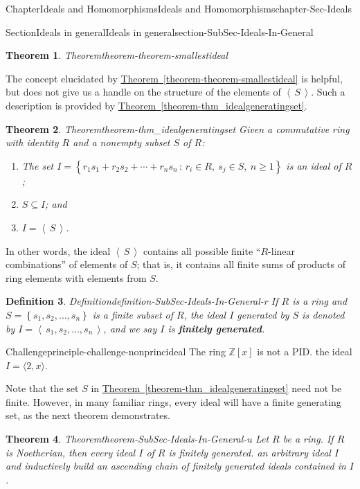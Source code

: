 \documentclass[oneside,10pt,]{book}
\newcommand{\xreffont}{\relax}
\newcommand{\terminology}[1]{\textbf{#1}}
\numberwithin{equation}{section}
\renewcommand{\ge}{\geqslant}
\newcommand{\ideal}[1]{\left\langle\, #1 \,\right\rangle}
\newcommand{\set}[1]{\left\{ {#1} \right\}}
\newcommand{\setof}[2]{{\left\{#1\,\colon\,#2\right\}}}
\def\Z{{\mathbb Z}}
\newtheorem{theorem}{Theorem}[section]
\newtheorem{definition}[theorem]{Definition}
\begin{document}
\begin{chapterptx}{Chapter}{Ideals and Homomorphisms}{}{Ideals and Homomorphisms}{}{}{chapter-Sec-Ideals}
\begin{sectionptx}{Section}{Ideals in general}{}{Ideals in general}{}{}{section-SubSec-Ideals-In-General}
\begin{theorem}{Theorem}{}{}{theorem-theorem-smallestideal}
\end{theorem}
The concept elucidated by \hyperref[theorem-theorem-smallestideal]{Theorem~{\xreffont\ref{theorem-theorem-smallestideal}}} is helpful, but does not give us a handle on the structure of the elements of \(\ideal{S}\). Such a description is provided by \hyperref[theorem-thm_idealgeneratingset]{Theorem~{\xreffont\ref{theorem-thm_idealgeneratingset}}}.%
\begin{theorem}{Theorem}{}{}{theorem-thm_idealgeneratingset}%
Given a commutative ring with identity \(R\) and a nonempty subset \(S\) of \(R\):%
\begin{enumerate}
\item{}The set \(I = \setof{r_1 s_1 + r_2 s_2 + \cdots + r_n s_n}{r_i\in R, \ s_j \in S,\ n\ge 1}\) is an ideal of \(R\);%
\item{}\(S\subseteq I\); and%
\item{}\(I = \ideal{S}\).%
\end{enumerate}
%
\end{theorem}
In other words, the ideal \(\ideal{S}\) contains all possible finite ``\(R\)-linear combinations'' of elements of \(S\); that is, it contains all finite sums of products of ring elements with elements from \(S\).%
\begin{definition}{Definition}{}{definition-SubSec-Ideals-In-General-r}%
If \(R\) is a ring and \(S = \set{s_1, s_2, \ldots,
s_n}\) is a finite subset of \(R\), the ideal \(I\) generated by \(S\) is denoted by \(I = \ideal{s_1, s_2, \ldots,
s_n}\), and we say \(I\) is \terminology{finitely generated}.%
\end{definition}
\begin{principle}{Challenge}{}{}{principle-challenge-nonprincideal}%
The ring \(\Z[x]\) is not a PID.%
\noindentConsider the ideal \(I = \langle 2, x \rangle\).%
\end{principle}
Note that the set \(S\) in \hyperref[theorem-thm_idealgeneratingset]{Theorem~{\xreffont\ref{theorem-thm_idealgeneratingset}}} need not be finite. However, in many familiar rings, every ideal will have a finite generating set, as the next theorem demonstrates.%
\begin{theorem}{Theorem}{}{}{theorem-SubSec-Ideals-In-General-u}%
Let \(R\) be a ring. If \(R\) is Noetherian\footnotemark{}, then every ideal \(I\) of \(R\) is finitely generated.%
\noindentConsider an arbitrary ideal \(I\) and inductively build an ascending chain of finitely generated ideals contained in \(I\).%
\end{theorem}

\end{sectionptx}
\end{chapterptx}
\end{document}
